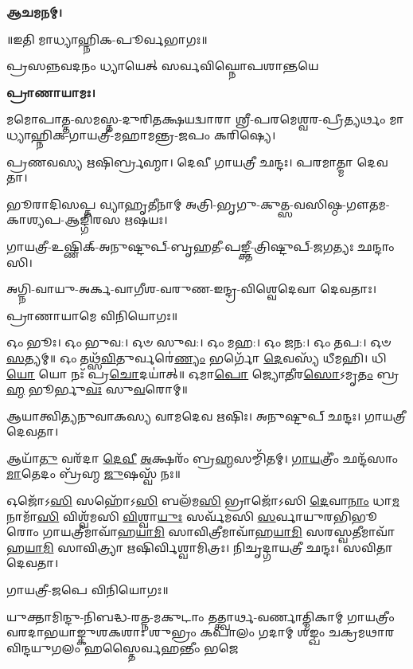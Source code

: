 \textbf{𑌆𑌚𑌮𑌨𑌮𑍍।}


\centerline{॥𑌇𑌤𑌿 𑌮𑌾𑌧𑍍𑌯𑌾𑌹𑍍𑌨𑌿𑌕-𑌪𑍂𑌰𑍍𑌵𑌭𑌾𑌗𑌃॥}



{𑌪𑍍𑌰𑌸𑌨𑍍𑌨𑌵𑌦𑌨𑌂 𑌧𑍍𑌯𑌾𑌯𑍇𑌤𑍍 𑌸𑌰𑍍𑌵𑌵𑌿𑌘𑍍𑌨𑍋𑌪𑌶𑌾𑌨𑍍𑌤𑌯𑍇}

\textbf{𑌪𑍍𑌰𑌾𑌣𑌾𑌯𑌾𑌮𑌃।}

𑌮𑌮𑍋𑌪𑌾𑌤𑍍𑌤-𑌸𑌮𑌸𑍍𑌤-𑌦𑍁𑌰𑌿𑌤𑌕𑍍𑌷𑌯𑌦𑍍𑌵𑌾𑌰𑌾 𑌶𑍍𑌰𑍀-𑌪𑌰𑌮𑍇𑌶𑍍𑌵𑌰-𑌪𑍍𑌰𑍀𑌤𑍍𑌯𑌰𑍍𑌥𑌂 𑌮𑌾𑌧𑍍𑌯𑌾𑌹𑍍𑌨𑌿𑌕-𑌗𑌾𑌯𑌤𑍍𑌰𑍀-𑌮𑌹𑌾𑌮𑌨𑍍𑌤𑍍𑌰-𑌜𑌪𑌂 𑌕𑌰𑌿𑌷𑍍𑌯𑍇।


𑌪𑍍𑌰𑌣𑌵𑌸𑍍𑌯 𑌋𑌷𑌿𑌰𑍍𑌬𑍍𑌰𑌹𑍍𑌮𑌾।
𑌦𑍇𑌵𑍀 𑌗𑌾𑌯𑌤𑍍𑌰𑍀 𑌛𑌨𑍍𑌦𑌃।
𑌪𑌰𑌮𑌾𑌤𑍍𑌮𑌾 𑌦𑍇𑌵𑌤𑌾।

𑌭𑍂𑌰𑌾𑌦𑌿𑌸𑌪𑍍𑌤 𑌵𑍍𑌯𑌾𑌹𑍃𑌤𑍀𑌨𑌾𑌮𑍍 𑌅𑌤𑍍𑌰𑌿-𑌭𑍃𑌗𑍁-𑌕𑍁𑌤𑍍𑌸-𑌵𑌸𑌿𑌷𑍍𑌠-𑌗𑍗𑌤𑌮-𑌕𑌾𑌶𑍍𑌯𑌪-𑌆𑌙𑍍𑌗𑌿𑌰𑌸 𑌋𑌷𑌯𑌃।

𑌗𑌾𑌯𑌤𑍍𑌰𑍀-𑌉𑌷𑍍𑌣𑌿𑌕𑍍-𑌅𑌨𑍁𑌷𑍍𑌟𑍁𑌪𑍍-𑌬𑍃𑌹𑌤𑍀-𑌪𑌙𑍍𑌕𑍍𑌤𑍀-𑌤𑍍𑌰𑌿𑌷𑍍𑌟𑍁𑌪𑍍-𑌜𑌗𑌤𑍍𑌯𑌃 𑌛𑌨𑍍𑌦𑌾𑌂𑌸𑌿।

𑌅𑌗𑍍𑌨𑌿-𑌵𑌾𑌯𑍁-𑌅𑌰𑍍𑌕-𑌵𑌾𑌗𑍀𑌶-𑌵𑌰𑍁𑌣-𑌇𑌨𑍍𑌦𑍍𑌰-𑌵𑌿𑌶𑍍𑌵𑍇𑌦𑍇𑌵𑌾 𑌦𑍇𑌵𑌤𑌾𑌃।
      
𑌪𑍍𑌰𑌾𑌣𑌾𑌯𑌾𑌮𑍇 𑌵𑌿𑌨𑌿𑌯𑍋𑌗𑌃॥


𑌓𑌂 𑌭𑍂𑌃। 𑌓𑌂 𑌭𑍁𑌵:। 𑌓𑍞 𑌸𑍁𑌵:। 𑌓𑌂 𑌮𑌹:। 𑌓𑌂 𑌜𑌨:। 𑌓𑌂 𑌤𑌪:। 𑌓𑍞 \ul{𑌸}\-𑌤𑍍𑌯𑌮𑍍॥
𑌓𑌂 𑌤𑌥𑍍𑌸᳴\-\ul{𑌵𑌿}\-𑌤𑍁𑌰𑍍𑌵𑌰𑍇॑\-\ul{𑌣𑍍𑌯𑌂} 𑌭𑌰𑍍𑌗𑍋᳴ \ul{𑌦𑍇}\-𑌵𑌸𑍍𑌯᳴ 𑌧𑍀𑌮𑌹𑌿। 𑌧𑌿\-\ul{𑌯𑍋} 𑌯𑍋 𑌨𑌃᳴ 𑌪𑍍𑌰\-\ul{𑌚𑍋}\-𑌦𑌯𑌾॑𑌤𑍍॥
𑌓𑌮𑌾\-\ul{𑌪𑍋} 𑌜𑍍𑌯𑍋\-\ul{𑌤𑍀}\-𑌰\-\ul{𑌸𑍋}\-𑌽𑌮𑍃\-\ul{𑌤𑌂} 𑌬𑍍𑌰\-\ul{𑌹𑍍𑌮} 𑌭𑍂𑌰𑍍𑌭𑍁\-\ul{𑌵𑌃} 𑌸𑍁\-\ul{𑌵}\-𑌰𑍋𑌮𑍍॥




𑌆𑌯𑌾𑌤𑍍𑌵𑌿𑌤𑍍𑌯𑌨𑍁𑌵𑌾𑌕𑌸𑍍𑌯 𑌵𑌾𑌮𑌦𑍇𑌵 𑌋𑌷𑌿𑌃।
𑌅𑌨𑍁𑌷𑍍𑌟𑍁𑌪𑍍 𑌛𑌨𑍍𑌦𑌃।
𑌗𑌾𑌯𑌤𑍍𑌰𑍀 𑌦𑍇𑌵𑌤𑌾।

𑌆𑌯𑌾᳴\-\ul{𑌤𑍁} 𑌵𑌰᳴𑌦𑌾 \ul{𑌦𑍇}\-\-\ul{𑌵𑍀} \ul{𑌅}\-𑌕𑍍𑌷𑌰𑌂᳴ 𑌬𑍍𑌰\-\ul{𑌹𑍍𑌮}\-𑌸𑌮𑍍𑌮𑌿᳴𑌤𑌮𑍍। \ul{𑌗𑌾}\-\-\ul{𑌯}\-𑌤𑍍𑌰𑍀𑌂॑ 𑌛𑌨𑍍𑌦᳴𑌸𑌾𑌂 \ul{𑌮𑌾}\-𑌤𑍇𑌦𑌂 𑌬𑍍𑌰᳴𑌹𑍍𑌮 \ul{𑌜𑍁}\-𑌷𑌸𑍍𑌵᳴ 𑌨𑌃॥

𑌓𑌜𑍋᳴𑌽\-\ul{𑌸𑌿} 𑌸𑌹𑍋᳴𑌽\-\ul{𑌸𑌿} 𑌬𑌲᳴𑌮\-\ul{𑌸𑌿} 𑌭𑍍𑌰𑌾𑌜𑍋᳴𑌽𑌸𑌿 \ul{𑌦𑍇}\-𑌵𑌾\-\ul{𑌨𑌾𑌂} 𑌧𑌾\-\ul{𑌮} 𑌨𑌾𑌮𑌾᳴\-\ul{𑌸𑌿} 𑌵𑌿𑌶𑍍𑌵᳴𑌮𑌸𑌿 \ul{𑌵𑌿}\-𑌶𑍍𑌵𑌾\-\ul{𑌯𑍁𑌃} 𑌸𑌰𑍍𑌵᳴𑌮𑌸𑌿 \ul{𑌸}\-𑌰𑍍𑌵𑌾𑌯𑍁𑌰𑌭𑌿𑌭𑍂𑌰𑍋𑌂 𑌗𑌾𑌯𑌤𑍍𑌰𑍀𑌮𑌾𑌵𑌾᳴𑌹\-\ul{𑌯𑌾}\-\-\ul{𑌮𑌿} 𑌸𑌾𑌵𑌿𑌤𑍍𑌰𑍀𑌮𑌾𑌵𑌾᳴𑌹\-\ul{𑌯𑌾}\-\-\ul{𑌮𑌿} 𑌸𑌰𑌸𑍍𑌵𑌤𑍀𑌮𑌾𑌵𑌾᳴𑌹\-\-\ul{𑌯𑌾}\-\-\ul{𑌮𑌿} 𑌸𑌾𑌵𑌿𑌤𑍍𑌰𑍍𑌯𑌾 𑌋𑌷𑌿𑌰𑍍𑌵𑌿𑌶𑍍𑌵𑌾𑌮𑌿𑌤𑍍𑌰𑌃। 𑌨𑌿𑌚𑍃𑌦𑍍𑌗𑌾𑌯𑌤𑍍𑌰𑍀 𑌛𑌨𑍍𑌦𑌃। 𑌸𑌵𑌿𑌤𑌾 𑌦𑍇𑌵𑌤𑌾।

𑌗𑌾𑌯𑌤𑍍𑌰𑍀-𑌜𑌪𑍇 𑌵𑌿𑌨𑌿𑌯𑍋𑌗𑌃॥



{𑌯𑍁𑌕𑍍𑌤𑌾𑌮𑌿𑌨𑍍𑌦𑍁-𑌨𑌿𑌬𑌦𑍍𑌧-𑌰𑌤𑍍𑌨-𑌮𑌕𑍁𑌟𑌾𑌂 𑌤𑌤𑍍𑌤𑍍𑌵𑌾𑌰𑍍𑌥-𑌵𑌰𑍍𑌣𑌾𑌤𑍍𑌮𑌿𑌕𑌾𑌮𑍍}
{𑌗𑌾𑌯𑌤𑍍𑌰𑍀𑌂 𑌵𑌰𑌦𑌾𑌭𑌯𑌾𑌙𑍍𑌕𑍁𑌶𑌕𑌶𑌾𑌃 𑌶𑍁𑌭𑍍𑌰𑌂 𑌕𑌪𑌾𑌲𑌂 𑌗𑌦𑌾𑌮𑍍}
{𑌶𑌙𑍍𑌖𑌂 𑌚𑌕𑍍𑌰𑌮𑌥𑌾𑌰𑌵𑌿𑌨𑍍𑌦𑌯𑍁𑌗𑌲𑌂 𑌹𑌸𑍍𑌤𑍈𑌰𑍍𑌵𑌹𑌨𑍍𑌤𑍀𑌂 𑌭𑌜𑍇}

